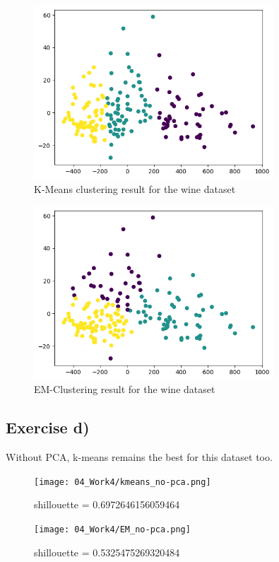\documentclass{article}
\begin{document}
\begin{figure}[h]
    \centering
    \includegraphics[width=0.8\textwidth]{output1.png}
    \caption{K-Means clustering result for the wine dataset}
\end{figure}

\begin{figure}[h!]
    \centering
    \includegraphics[width=0.8\textwidth]{output2.png}
    \caption{EM-Clustering result for the wine dataset}
\end{figure}

\clearpage

\subsection{Exercise d)}
Without PCA, k-means remains the best for this dataset too. \\
\begin{figure}[h!]
    \centering
    \texttt{[image: 04\_Work4/kmeans\_no-pca.png]}
    \caption{shillouette = 0.6972646156059464}
\end{figure}
\begin{figure}[h!]
    \centering
    \texttt{[image: 04\_Work4/EM\_no-pca.png]}
    \caption{shillouette = 0.5325475269320484}
\end{figure}
\end{document}
